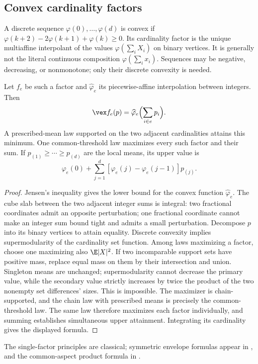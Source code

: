\subsection{Convex cardinality factors}
A discrete sequence $\varphi(0),\ldots,\varphi(d)$ is convex if
$\varphi(k+2)-2\varphi(k+1)+\varphi(k)\ge0$. Its cardinality factor
is the unique multiaffine interpolant of the values
$\varphi(\sum_iX_i)$ on binary vertices. It is generally not the literal
continuous composition $\varphi(\sum_ix_i)$. Sequences may be negative,
decreasing, or nonmonotone; only their discrete convexity is needed.

\begin{lemma}\label{lem:cardinality-envelopes}
Let $f_e$ be such a factor and $\widehat\varphi_e$ its piecewise-affine
interpolation between integers. Then
\[
 \vex f_e(p)=\widehat\varphi_e\Bigl(\sum_{i\in e}p_i\Bigr).
\]
A prescribed-mean law supported on the two adjacent cardinalities attains
this minimum. One common-threshold law maximizes every such factor and
their sum. If $p_{(1)}\ge\cdots\ge p_{(d)}$ are the local means, its
upper value is
\[
 \varphi_e(0)+\sum_{j=1}^d[\varphi_e(j)-\varphi_e(j-1)]p_{(j)}.
\]
\end{lemma}
\begin{proof}
Jensen's inequality gives the lower bound for the convex function
$\widehat\varphi_e$. The cube slab between the two adjacent integer
sums is integral: two fractional coordinates admit an opposite
perturbation; one fractional coordinate cannot make an integer sum
bound tight and admits a small perturbation. Decompose $p$ into its
binary vertices to attain equality.
Discrete convexity implies supermodularity of the cardinality set
function. Among laws maximizing a factor, choose one maximizing also
$\E|X|^2$. If two incomparable support sets have positive mass, replace
equal mass on them by their intersection and union. Singleton means
are unchanged; supermodularity cannot decrease the primary value,
while the secondary value strictly increases by twice the product of
the two nonempty set differences' sizes. This is impossible. The
maximizer is chain-supported, and the chain law with prescribed means
is precisely the common-threshold law. The same law therefore maximizes
each factor individually, and summing establishes simultaneous upper
attainment. Integrating its cardinality gives the displayed formula.
\end{proof}
The single-factor principles are classical; symmetric envelope formulas
appear in \citet{Sherali1997}, and the common-aspect product formula in
\citet[Proposition 4.1]{AdamsGupteXu2019}.

